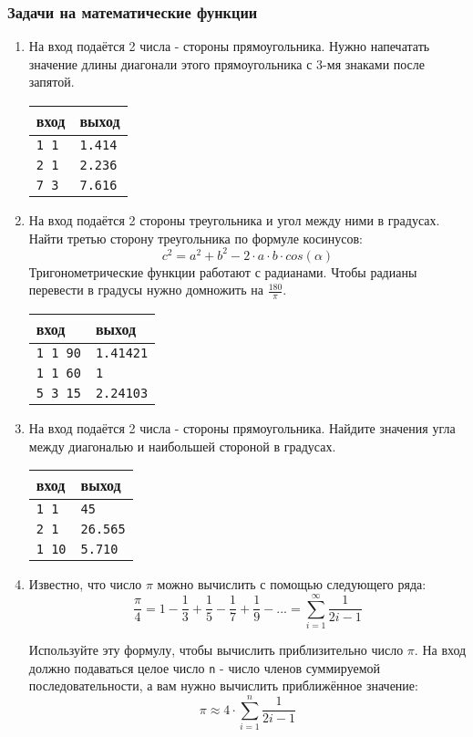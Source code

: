 \documentclass{article}
\begin{document}
\subsubsection*{Задачи на математические функции}
\begin{enumerate}
\item На вход подаётся 2 числа - стороны прямоугольника. Нужно напечатать значение длины диагонали этого прямоугольника с 3-мя знаками после запятой.
\begin{center}
\begin{tabular}{ l l }
 вход & выход \\ \hline
 \texttt{1 1} & \texttt{1.414}  \\ 
 \texttt{2 1} & \texttt{2.236}  \\ 
 \texttt{7 3} & \texttt{7.616}  \\
\end{tabular}
\end{center}

\item На вход подаётся 2 стороны треугольника и угол между ними в градусах. Найти третью сторону треугольника по формуле косинусов:
$$
c^2 = a^2 + b^2 - 2 \cdot a \cdot b \cdot cos(\alpha)
$$
Тригонометрические функции работают с радианами. Чтобы радианы перевести в градусы нужно домножить на $\frac{180}{\pi}$. 
\begin{center}
\begin{tabular}{ l l }
 вход & выход \\ \hline
 \texttt{1 1 90} & \texttt{1.41421}  \\ 
 \texttt{1 1 60} & \texttt{1}  \\ 
 \texttt{5 3 15} & \texttt{2.24103}  \\
\end{tabular}
\end{center}
\item На вход подаётся 2 числа - стороны прямоугольника. Найдите значения угла между диагональю и наибольшей стороной в градусах. 
\begin{center}
\begin{tabular}{ l l }
 вход & выход \\ \hline
 \texttt{1 1} & \texttt{45}  \\ 
 \texttt{2 1} & \texttt{26.565}  \\ 
 \texttt{1 10} & \texttt{5.710}  \\
\end{tabular}
\end{center}
\item Известно, что число $\pi$ можно вычислить с помощью следующего ряда:
$$
\frac{\pi}{4} = 1 - \frac{1}{3} + \frac{1}{5} - \frac{1}{7} + \frac{1}{9} - ... = \sum_{i=1}^{\infty} \frac{1}{2i-1}
$$

Используйте эту формулу, чтобы вычислить приблизительно число $\pi$. На вход должно подаваться целое число \texttt{n} - число членов суммируемой последовательности, а вам нужно вычислить приближённое значение:
$$
\pi \approx 4 \cdot \sum_{i=1}^{n} \frac{1}{2i-1}
$$
\end{enumerate}
\end{document}
